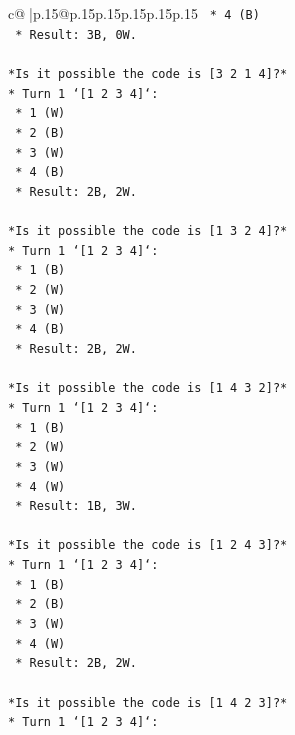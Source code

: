 \documentclass{article}
\begin{document}
{\begin{supertabular}{c@{$\;$}|p{.15\linewidth}@{}p{.15\linewidth}p{.15\linewidth}p{.15\linewidth}p{.15\linewidth}p{.15\linewidth}}
{{{\texttt{    *   4 (B)} \\
\texttt{    *   Result: 3B, 0W.} \\
\\ 
\texttt{*Is it possible the code is {[}3 2 1 4{]}?*} \\
\texttt{*   Turn 1 `{[}1 2 3 4{]}`:} \\
\texttt{    *   1 (W)} \\
\texttt{    *   2 (B)} \\
\texttt{    *   3 (W)} \\
\texttt{    *   4 (B)} \\
\texttt{    *   Result: 2B, 2W.} \\
\\ 
\texttt{*Is it possible the code is {[}1 3 2 4{]}?*} \\
\texttt{*   Turn 1 `{[}1 2 3 4{]}`:} \\
\texttt{    *   1 (B)} \\
\texttt{    *   2 (W)} \\
\texttt{    *   3 (W)} \\
\texttt{    *   4 (B)} \\
\texttt{    *   Result: 2B, 2W.} \\
\\ 
\texttt{*Is it possible the code is {[}1 4 3 2{]}?*} \\
\texttt{*   Turn 1 `{[}1 2 3 4{]}`:} \\
\texttt{    *   1 (B)} \\
\texttt{    *   2 (W)} \\
\texttt{    *   3 (W)} \\
\texttt{    *   4 (W)} \\
\texttt{    *   Result: 1B, 3W.} \\
\\ 
\texttt{*Is it possible the code is {[}1 2 4 3{]}?*} \\
\texttt{*   Turn 1 `{[}1 2 3 4{]}`:} \\
\texttt{    *   1 (B)} \\
\texttt{    *   2 (B)} \\
\texttt{    *   3 (W)} \\
\texttt{    *   4 (W)} \\
\texttt{    *   Result: 2B, 2W.} \\
\\ 
\texttt{*Is it possible the code is {[}1 4 2 3{]}?*} \\
\texttt{*   Turn 1 `{[}1 2 3 4{]}`:} \\
}}}
\end{supertabular}}
\end{document}
